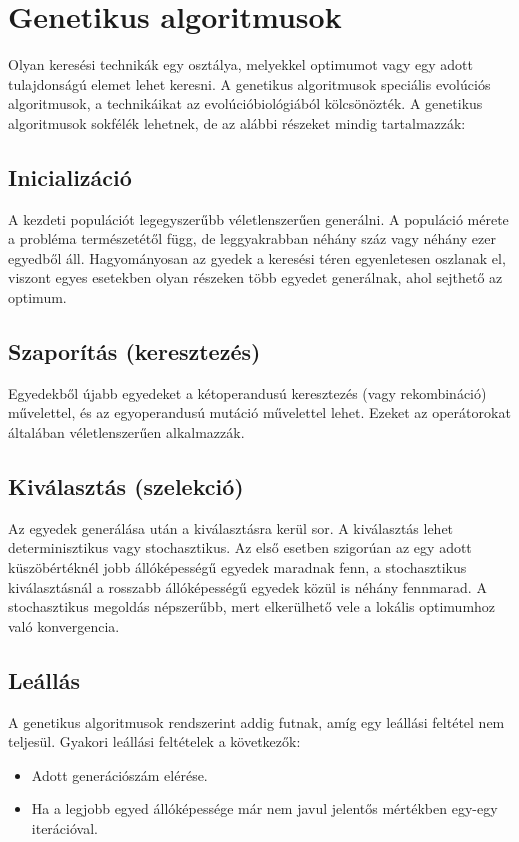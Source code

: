 \section{Genetikus algoritmusok}

Olyan keresési technikák egy osztálya, melyekkel optimumot vagy egy adott tulajdonságú elemet lehet keresni. A genetikus algoritmusok speciális evolúciós algoritmusok, a technikáikat az evolúcióbiológiából kölcsönözték. 
A genetikus algoritmusok sokfélék lehetnek, de az alábbi részeket mindig tartalmazzák: 

\subsection{Inicializáció}
A kezdeti populációt legegyszerűbb véletlenszerűen generálni. A populáció mérete a probléma természetétől függ, de leggyakrabban néhány száz vagy néhány ezer egyedből áll. Hagyományosan az gyedek a keresési téren egyenletesen oszlanak el, viszont egyes esetekben olyan részeken több egyedet generálnak, ahol sejthető az optimum. 

\subsection{Szaporítás (keresztezés)}
Egyedekből újabb egyedeket a kétoperandusú keresztezés (vagy rekombináció) művelettel, és az egyoperandusú mutáció művelettel lehet. Ezeket az operátorokat általában véletlenszerűen alkalmazzák. 

\subsection{Kiválasztás (szelekció)}
Az egyedek generálása után a kiválasztásra kerül sor. A kiválasztás lehet determinisztikus vagy stochasztikus. Az első esetben szigorúan az egy adott küszöbértéknél jobb állóképességű egyedek maradnak fenn, a stochasztikus kiválasztásnál a rosszabb állóképességű egyedek közül is néhány fennmarad. A stochasztikus megoldás népszerűbb, mert elkerülhető vele a lokális optimumhoz való konvergencia.

\subsection{Leállás}
A genetikus algoritmusok rendszerint addig futnak, amíg egy leállási feltétel nem teljesül. Gyakori leállási feltételek a következők: 

\begin{itemize}
	\item{Adott generációszám elérése.}
	\item{Ha a legjobb egyed állóképessége már nem javul jelentős mértékben egy-egy iterációval. }
\end{itemize}